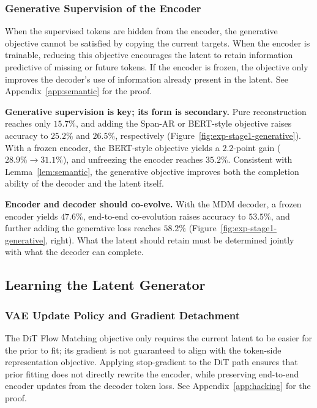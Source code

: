 \subsubsection{Generative Supervision of the Encoder}

\begin{lemma}
\label{lem:semantic}
When the supervised tokens are hidden from the encoder, the generative objective cannot be satisfied by copying the current targets. When the encoder is trainable, reducing this objective encourages the latent to retain information predictive of missing or future tokens. If the encoder is frozen, the objective only improves the decoder's use of information already present in the latent. See Appendix~\ref{app:semantic} for the proof.
\end{lemma}

\textbf{\obs{} Generative supervision is key; its form is secondary.} Pure reconstruction reaches only $15.7\%$, and adding the Span-AR or BERT-style objective raises accuracy to $25.2\%$ and $26.5\%$, respectively (Figure~\ref{fig:exp-stage1-generative}). With a frozen encoder, the BERT-style objective yields a $2.2$-point gain ($28.9\%\to31.1\%$), and unfreezing the encoder reaches $35.2\%$. Consistent with Lemma~\ref{lem:semantic}, the generative objective improves both the completion ability of the decoder and the latent itself.

\textbf{\obs{} Encoder and decoder should co-evolve.} With the MDM decoder, a frozen encoder yields $47.6\%$, end-to-end co-evolution raises accuracy to $53.5\%$, and further adding the generative loss reaches $58.2\%$ (Figure~\ref{fig:exp-stage1-generative}, right). What the latent should retain must be determined jointly with what the decoder can complete.

\subsection{Learning the Latent Generator}
\label{subsec:exp-stage2}

\subsubsection{VAE Update Policy and Gradient Detachment}

\begin{lemma}
\label{lem:hacking}
The DiT Flow Matching objective only requires the current latent to be easier for the prior to fit; its gradient is not guaranteed to align with the token-side representation objective. Applying stop-gradient to the DiT path ensures that prior fitting does not directly rewrite the encoder, while preserving end-to-end encoder updates from the decoder token loss. See Appendix~\ref{app:hacking} for the proof.
\end{lemma}

